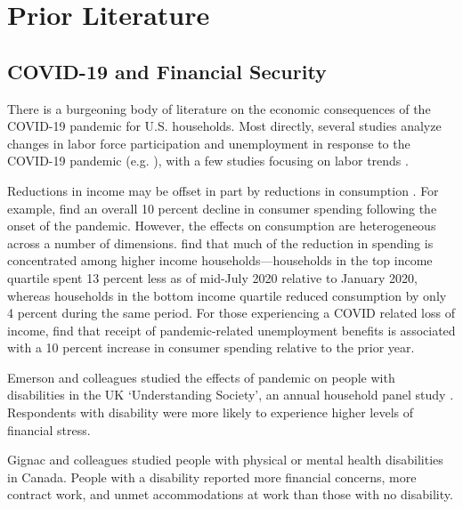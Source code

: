 \documentclass[12pt]{article}
\begin{document}
\section{ Prior Literature}

 

\subsection{COVID-19 and  Financial Security  }

There is a burgeoning body of literature on the economic consequences of the COVID-19 pandemic for U.S. households. Most directly, several studies analyze changes in labor force participation and unemployment in response to the COVID-19 pandemic (e.g.  \cite{cheng2020back}), with a few studies focusing on labor trends  \citep{goda2021impact,moen2020disparate,quinby2021older}.   

Reductions in income may be offset in part by reductions in consumption  \citep{baker2020does,casado2020aggregate,chetty2020did,farrell2020consumption,horvath2021covid}. For example, \cite{farrell2020consumption} find an overall 10 percent decline in consumer spending following the onset of the pandemic. However, the effects on consumption are heterogeneous across a number of dimensions.  \cite{chetty2020did} find that much of the reduction in spending is concentrated among higher income households—households in the top income quartile spent 13 percent less as of mid-July 2020 relative to January 2020, whereas households in the bottom income quartile reduced consumption by only 4 percent during the same period. For those experiencing a COVID related loss of income, \cite{farrell2020consumption} find that receipt of pandemic-related unemployment benefits is associated with a 10 percent increase in consumer spending relative to the prior year. 


 
 
 Emerson and colleagues studied the effects of pandemic  on people with disabilities in the UK ‘Understanding Society’, an annual household panel study \citep{emerson2021impact}. Respondents with disability were more likely to experience higher levels of financial stress.  

 Gignac and colleagues studied people with physical or mental health disabilities in Canada. People with a  disability reported more  financial concerns, more contract work, and unmet accommodations at work  than those with no disability. \citep{gignac2021impacts}
\end{document}
